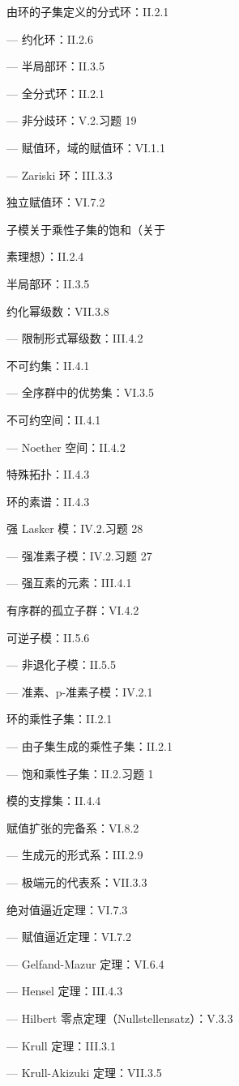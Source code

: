 由环的子集定义的分式环：II.2.1

--- 约化环：II.2.6

--- 半局部环：II.3.5

--- 全分式环：II.2.1

--- 非分歧环：V.2.习题 19

--- 赋值环，域的赋值环：VI.1.1

--- Zariski 环：III.3.3

独立赋值环：VI.7.2

子模关于乘性子集的饱和（关于

素理想）：II.2.4

半局部环：II.3.5

约化幂级数：VII.3.8

--- 限制形式幂级数：III.4.2

不可约集：II.4.1

--- 全序群中的优势集：VI.3.5

不可约空间：II.4.1

--- Noether 空间：II.4.2

特殊拓扑：II.4.3

环的素谱：II.4.3

强 Lasker 模：IV.2.习题 28

--- 强准素子模：IV.2.习题 27

--- 强互素的元素：III.4.1

有序群的孤立子群：VI.4.2

可逆子模：II.5.6

--- 非退化子模：II.5.5

--- 准素、p-准素子模：IV.2.1

环的乘性子集：II.2.1

--- 由子集生成的乘性子集：II.2.1

--- 饱和乘性子集：II.2.习题 1

模的支撑集：II.4.4

赋值扩张的完备系：VI.8.2

--- 生成元的形式系：III.2.9

--- 极端元的代表系：VII.3.3

绝对值逼近定理：VI.7.3

--- 赋值逼近定理：VI.7.2

--- Gelfand-Mazur 定理：VI.6.4

--- Hensel 定理：III.4.3

--- Hilbert 零点定理（Nullstellensatz）：V.3.3

--- Krull 定理：III.3.1

--- Krull-Akizuki 定理：VII.3.5

